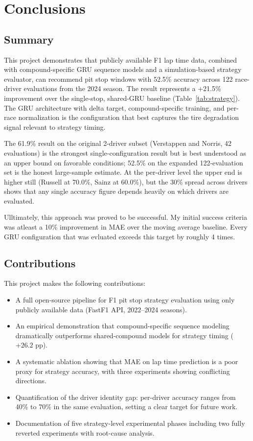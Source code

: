 \section{Conclusions}\label{sec:conclusions}

\subsection{Summary}

This project demonstrates that publicly available F1 lap time data, combined with compound-specific GRU sequence models and a simulation-based strategy evaluator, can recommend pit stop windows with 52.5\% accuracy across 122 race-driver evaluations from the 2024 season. The result represents a +21.5\% improvement over the single-stop, shared-GRU baseline (Table~\ref{tab:strategy}). The GRU architecture with delta target, compound-specific training, and per-race normalization is the configuration that best captures the tire degradation signal relevant to strategy timing.

The 61.9\% result on the original 2-driver subset (Verstappen and Norris, 42 evaluations) is the strongest single-configuration result but is best understood as an upper bound on favorable conditions; 52.5\% on the expanded 122-evaluation set is the honest large-sample estimate. At the per-driver level the upper end is higher still (Russell at 70.0\%, Sainz at 60.0\%), but the 30\% spread across drivers shows that any single accuracy figure depends heavily on which drivers are evaluated.

Ulltimately, this approach was proved to be successful. My initial success criteria was atleast a 10\% improvement in MAE over the moving average baseline. Every GRU configuration that was evluated exceeds this target by roughly 4 times. 

\subsection{Contributions}

This project makes the following contributions:

\begin{itemize}[noitemsep]
    \item A full open-source pipeline for F1 pit stop strategy evaluation using only publicly available data (FastF1 API, 2022--2024 seasons).
    \item An empirical demonstration that compound-specific sequence modeling dramatically outperforms shared-compound models for strategy timing ($+26.2$ pp).
    \item A systematic ablation showing that MAE on lap time prediction is a poor proxy for strategy accuracy, with three experiments showing conflicting directions.
    \item Quantification of the driver identity gap: per-driver accuracy ranges from 40\% to 70\% in the same evaluation, setting a clear target for future work.
    \item Documentation of five strategy-level experimental phases including two fully reverted experiments with root-cause analysis.
\end{itemize}

